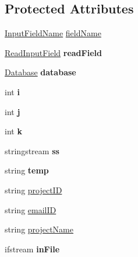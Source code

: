 \subsection*{Protected Attributes}
\begin{DoxyCompactItemize}
\item 
\hyperlink{classInputFieldName}{Input\-Field\-Name} \hyperlink{classInputDetail_ac6f85380c5152c406d483726382c4798}{field\-Name}
\item 
\hypertarget{classInputDetail_ac0cc70b017ef94fb55acb46fc44f0df5}{\hyperlink{classReadInputField}{Read\-Input\-Field} {\bfseries read\-Field}}\label{classInputDetail_ac0cc70b017ef94fb55acb46fc44f0df5}

\item 
\hypertarget{classInputDetail_a479cd6c13833bd5de6e5630078c961b6}{\hyperlink{classDatabase}{Database} {\bfseries database}}\label{classInputDetail_a479cd6c13833bd5de6e5630078c961b6}

\item 
\hypertarget{classInputDetail_a2e9226db1b744de4bf406398f48cf962}{int {\bfseries i}}\label{classInputDetail_a2e9226db1b744de4bf406398f48cf962}

\item 
\hypertarget{classInputDetail_af124a26cb4e4f86d0d9eb68200ee500b}{int {\bfseries j}}\label{classInputDetail_af124a26cb4e4f86d0d9eb68200ee500b}

\item 
\hypertarget{classInputDetail_a1bb6b8bff3d5fc6d5c998e4c451035bc}{int {\bfseries k}}\label{classInputDetail_a1bb6b8bff3d5fc6d5c998e4c451035bc}

\item 
\hypertarget{classInputDetail_a5284736b5fd3db0251cfeab7c581c0bd}{stringstream {\bfseries ss}}\label{classInputDetail_a5284736b5fd3db0251cfeab7c581c0bd}

\item 
\hypertarget{classInputDetail_abacd5d7ee7ebd7e9f36bbf3fefd13a5d}{string {\bfseries temp}}\label{classInputDetail_abacd5d7ee7ebd7e9f36bbf3fefd13a5d}

\item 
string \hyperlink{classInputDetail_a08069ee622c626c038b821ddcc7427b4}{project\-I\-D}
\item 
string \hyperlink{classInputDetail_ad3f1db4fddbe0d4efbf1d5bc74d52257}{email\-I\-D}
\item 
string \hyperlink{classInputDetail_aaaf51475a2a4ddbe34e38c96bdb45bad}{project\-Name}
\item 
\hypertarget{classPageLayout_a9abec89a54a6f0dac84114919d2ad117}{ifstream {\bfseries in\-File}}\label{classPageLayout_a9abec89a54a6f0dac84114919d2ad117}


\end{DoxyCompactItemize}
